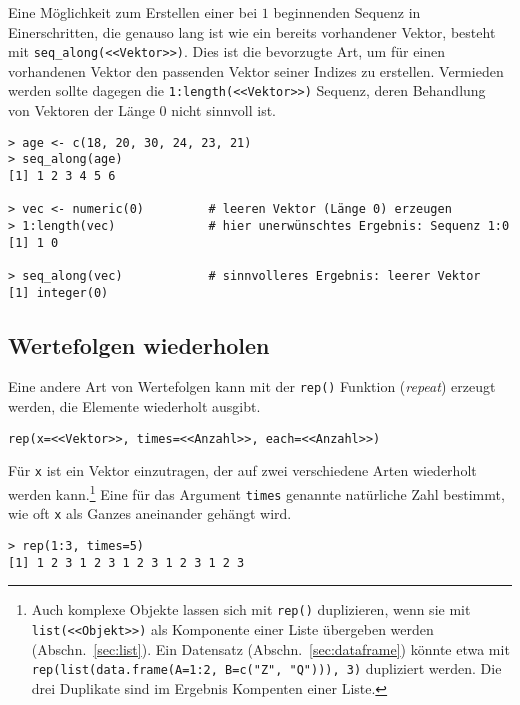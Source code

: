 Eine Möglichkeit zum Erstellen einer bei $1$ beginnenden Sequenz in Einerschritten, die genauso lang ist wie ein bereits vorhandener Vektor, besteht mit \lstinline!seq_along(<<Vektor>>)!. Dies ist die bevorzugte Art, um für einen vorhandenen Vektor den passenden Vektor seiner Indizes zu erstellen. Vermieden werden sollte dagegen die \lstinline!1:length(<<Vektor>>)! Sequenz, deren Behandlung von Vektoren der Länge $0$ nicht sinnvoll ist.
\begin{lstlisting}
> age <- c(18, 20, 30, 24, 23, 21)
> seq_along(age)
[1] 1 2 3 4 5 6

> vec <- numeric(0)         # leeren Vektor (Länge 0) erzeugen
> 1:length(vec)             # hier unerwünschtes Ergebnis: Sequenz 1:0
[1] 1 0

> seq_along(vec)            # sinnvolleres Ergebnis: leerer Vektor
[1] integer(0)
\end{lstlisting}

\subsection{Wertefolgen wiederholen}

Eine andere Art von Wertefolgen kann mit der \lstinline!rep()! Funktion (\emph{repeat}) erzeugt werden, die Elemente wiederholt ausgibt.
\begin{lstlisting}
rep(x=<<Vektor>>, times=<<Anzahl>>, each=<<Anzahl>>)
\end{lstlisting}

Für \lstinline!x! ist ein Vektor einzutragen, der auf zwei verschiedene Arten wiederholt werden kann.\footnote{Auch komplexe Objekte lassen sich mit \lstinline!rep()! duplizieren, wenn sie mit \lstinline!list(<<Objekt>>)! als Komponente einer Liste übergeben werden (Abschn.\ \ref{sec:list}). Ein Datensatz (Abschn.\ \ref{sec:dataframe}) könnte etwa mit \lstinline!rep(list(data.frame(A=1:2, B=c("Z", "Q"))), 3)! dupliziert werden. Die drei Duplikate sind im Ergebnis Kompenten einer Liste.} Eine für das Argument \lstinline!times! genannte natürliche Zahl bestimmt, wie oft \lstinline!x! als Ganzes aneinander gehängt wird.
\begin{lstlisting}
> rep(1:3, times=5)
[1] 1 2 3 1 2 3 1 2 3 1 2 3 1 2 3
\end{lstlisting}

